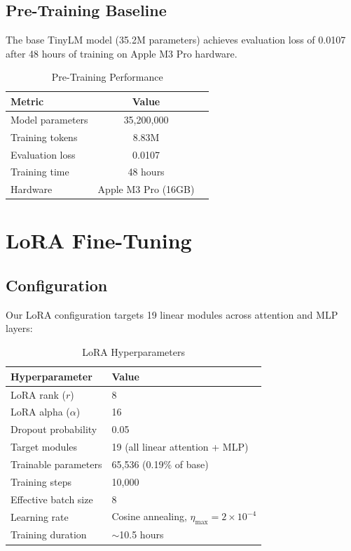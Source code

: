 \documentclass[11pt,a4paper,twocolumn]{article}
\theoremstyle{plain}
\theoremstyle{definition}
\begin{document}
\subsection{Pre-Training Baseline}

The base TinyLM model (35.2M parameters) achieves evaluation loss 
of 0.0107 after 48 hours of training on Apple M3 Pro hardware.

\begin{table}[H]
\centering
\caption{Pre-Training Performance}
\begin{tabular}{lcc}
\toprule
\textbf{Metric} & \textbf{Value} \\
\midrule
Model parameters & 35,200,000 \\
Training tokens & 8.83M \\
Evaluation loss & 0.0107 \\
Training time & 48 hours \\
Hardware & Apple M3 Pro (16GB) \\
\bottomrule
\end{tabular}
\end{table}

\section{LoRA Fine-Tuning}

\subsection{Configuration}

Our LoRA configuration targets 19 linear modules across attention 
and MLP layers:

\begin{table}[H]
\centering
\caption{LoRA Hyperparameters}
\begin{tabular}{ll}
\toprule
\textbf{Hyperparameter} & \textbf{Value} \\
\midrule
LoRA rank ($r$) & 8 \\
LoRA alpha ($\alpha$) & 16 \\
Dropout probability & 0.05 \\
Target modules & 19 (all linear attention + MLP) \\
Trainable parameters & 65,536 (0.19\% of base) \\
Training steps & 10,000 \\
Effective batch size & 8 \\
Learning rate & Cosine annealing, $\eta_{\max} = 2 \times 10^{-4}$ \\
Training duration & $\sim$10.5 hours \\
\bottomrule
\end{tabular}
\end{table}
\end{document}
